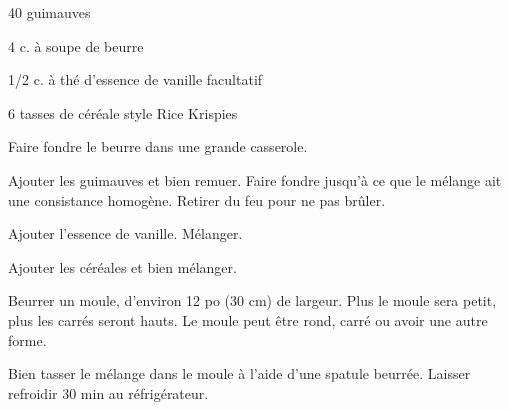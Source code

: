 %
%   
%   
%   
%





\totaltime{}


\begin{ingredients}
    \item 40 guimauves
    \item 4 c. à soupe de beurre
    \item 1/2 c. à thé d'essence de vanille facultatif
    \item 6 tasses de céréale style Rice Krispies
\end{ingredients}

\begin{steps}
    \item Faire fondre le beurre dans une grande casserole.
    \item Ajouter les guimauves et bien remuer. Faire fondre jusqu'à ce que le mélange ait une consistance homogène. Retirer du feu pour ne pas brûler.
    \item Ajouter l'essence de vanille. Mélanger.
    \item Ajouter les céréales et bien mélanger.
    \item Beurrer un moule, d'environ 12 po (30 cm) de largeur. Plus le moule sera petit, plus les carrés seront hauts. Le moule peut être rond, carré ou avoir une autre forme.
    \item Bien tasser le mélange dans le moule à l'aide d'une spatule beurrée. Laisser refroidir 30 min au réfrigérateur.
\end{steps}
